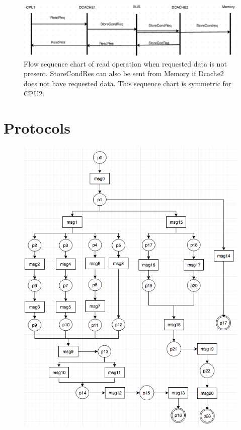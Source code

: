\documentclass[12pt,frontmatter,copyright,thesis]{usfmanus}
\begin{document}
\begin{appendix}
\begin{figure}[h]
 \centerline{
 \includegraphics[width=3.9In]{figures/read2.png}}
 \caption{\footnotesize Flow sequence chart of read operation when requested data is not present. StoreCondRes can also be sent from Memory if Dcache2 does not have requested data. This sequence chart is symmetric for CPU2. }
 \label{read2}
 \end{figure}
\newpage
\section{Protocols}%
\begin{figure}[h]
\centerline{
 \includegraphics[width=3.1In]{figures/Fig5.png}}%
\begin{minipage}{.5\textwidth}

\end{minipage}
\end{figure}
\end{appendix}
\end{document}
